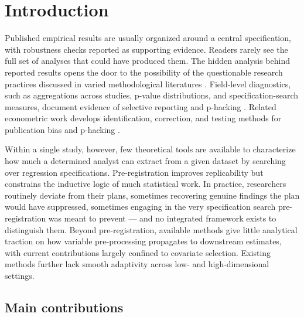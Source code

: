 \section{Introduction}
\label{sec:introduction}

Published empirical results are usually organized around a central
specification, with robustness checks reported as supporting evidence. Readers
rarely see the full set of analyses that could have produced them. The hidden analysis behind reported results
opens the door to the possibility of the questionable research practices discussed in
varied methodological literatures
\citep{simmonsFalsePositivePsychologyUndisclosed2011,johnMeasuringPrevalenceQuestionable2012,kerr1998harking,gelmanLoken2013,wicherts2016degrees}.
Field-level diagnostics, such as aggregations across studies, p-value
distributions, and specification-search measures, document evidence of
selective reporting and p-hacking
\citep{franco2014publication,head2015extent,brodeur2016star,brodeur2020methods,vivalt2019specification,jerke2025publication}.
Related econometric work develops identification, correction, and testing
methods for publication bias and p-hacking
\citep{andrews2019identification,elliott2022detecting}.

Within a single study, however, few theoretical tools are available to
characterize how much a determined analyst can extract from a given dataset by
searching over regression specifications. Pre-registration improves
replicability but constrains the inductive logic of much statistical work.
In practice, researchers routinely deviate from their plans, sometimes
recovering genuine findings the plan would have suppressed, sometimes engaging
in the very specification search pre-registration was meant to prevent --- and
no integrated framework exists to distinguish them. Beyond pre-registration,
available methods give little analytical traction on how variable
pre-processing propagates to downstream estimates, with current contributions
largely confined to covariate selection. Existing methods further lack smooth
adaptivity across low- and high-dimensional settings.

\subsection{Main contributions} 

